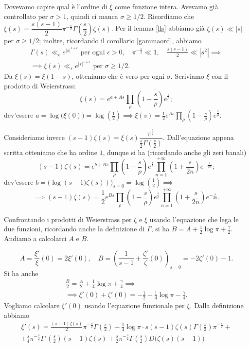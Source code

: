 Dovevamo capire qual è l'ordine di $\xi$ come funzione intera. Avevamo già controllato per $\sigma>1$, quindi ci manca $\sigma \ge 1/2$. Ricordiamo che $\xi(s)=\dfrac{s(s-1)}{2}\pi^{-\frac{s}{2}}\Gamma\left(\dfrac{s}{2}\right)\zeta(s)$. Per il lemma \ref{lls} abbiamo già $\zeta(s) \ll |s|$ per $\sigma \ge 1/2$; inoltre, ricordando il corollario \ref{gammaord}, abbiamo
\begin{gather*}
  \Gamma(s) \ll_{\epsilon} e^{|s|^{1+\epsilon}} \text{ per ogni } \epsilon>0, \quad \pi^{-\frac{s}{2}} \ll 1, \quad \frac{s(s-1)}{2} \ll |s^2| \implies \\
  \implies \xi(s) \ll_{\epsilon} e^{|s|^{1+\epsilon}} \text{ per }\sigma \ge 1/2.
\end{gather*}
Da $\xi(s)=\xi(1-s)$, otteniamo che è vero per ogni $\sigma$. Scriviamo $\xi$ con il prodotto di Weierstrass:
$$\xi(s)=e^{a+As}\prod_{\rho}\left(1-\frac{s}{\rho}\right)e^{\frac{s}{\rho}};$$
dev'essere $\displaystyle a=\log\big(\xi(0)\big)=\log\left(\frac{1}{2}\right) \implies \xi(s)=\frac{1}{2}e^{As}\prod_{\rho}\left(1-\frac{s}{\rho}\right)e^{\frac{s}{\rho}}$.

Consideriamo invece $(s-1)\zeta(s)=\xi(s)\dfrac{\pi^{\frac{s}{2}}}{\frac{s}{2}\Gamma\left(\frac{s}{2}\right)}$. Dall'equazione appena scritta otteniamo che ha ordine $1$, dunque si ha (ricordando anche gli zeri banali)
$$(s-1)\zeta(s)=e^{b+Bs}\prod_{\rho}\left(1-\frac{s}{\rho}\right)e^{\frac{s}{\rho}}\prod_{n=1}^{+\infty}\left(1+\frac{s}{2n}\right)e^{-\frac{s}{2n}};$$
dev'essere $\displaystyle b=\Bigg(\log\left(s-1)\zeta(s)\right)\Bigg)_{s=0}=\log\left(\frac{1}{2}\right) \implies$
$$\implies (s-1)\zeta(s)=\frac{1}{2}e^{Bs}\prod_{\rho}\left(1-\frac{s}{\rho}\right)e^{\frac{s}{\rho}}\prod_{n=1}^{+\infty}\left(1+\frac{s}{2n}\right)e^{-\frac{s}{2n}}.$$

Confrontando i prodotti di Weierstrass per $\zeta$ e $\xi$ usando l'equazione che lega le due funzioni, ricordando anche la definizione di $\Gamma$, si ha $B=A+\frac{1}{2}\log{\pi}+\frac{\gamma}{2}$. Andiamo a calcolarci $A$ e $B$.

$$A=\frac{\xi'}{\xi}(0)=2\xi'(0), \quad B=\left(\frac{1}{s-1}+\frac{\zeta'}{\zeta}(0)\right)_{s=0}=-2\zeta'(0)-1.$$
Si ha anche
\begin{gather*}
  \frac{B}{2}=\frac{A}{2}+\frac{1}{4}\log{\pi}+\frac{\gamma}{4} \implies \\
  \implies \xi'(0)+\zeta'(0)=-\frac{1}{2}-\frac{1}{4}\log{\pi}-\frac{\gamma}{4}.
\end{gather*}
Vogliamo calcolare $\xi'(0)$ usando l'equazione funzionale per $\xi$. Dalla definizione abbiamo
\begin{gather*}
  \xi'(s)=\frac{(s-1)\zeta(s)}{2}\pi^{-\frac{s}{2}}\Gamma\left(\frac{s}{2}\right)-\frac{1}{4}\log{\pi}\cdot s(s-1)\zeta(s)\Gamma\left(\frac{s}{2}\right)\pi^{-\frac{s}{2}}+ \\
  +\frac{s}{4}\pi^{-\frac{s}{2}}\Gamma'\left(\frac{s}{2}\right)(s-1)\zeta(s)+\frac{s}{2}\pi^{-\frac{s}{2}}\Gamma\left(\frac{s}{2}\right)D\big(\zeta(s)(s-1)\big)
\end{gather*}

